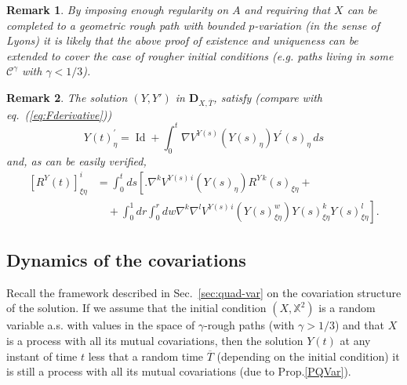 \documentclass[a4paper,12pt,reqno]{amsart}
\DeclareMathOperator{\id}{Id}
\newtheorem{remark}{Remark}
\newcommand{\CC}{\mathscr{C}}
\newcommand{\DX}{\mathscr{D}_{X}}
\begin{document}
\begin{remark}
By imposing enough regularity on $A$ and requiring that $X$
can be completed to a geometric rough path with bounded $p$-variation
(in the sense of Lyons)  it is likely that the above proof of
existence and uniqueness can be extended to cover the case of rougher initial conditions
(e.g. paths living in some $\CC^\gamma$ with $\gamma < 1/3$).
\end{remark}

\begin{remark}
The solution $(Y,Y')$ in $\mathbf{D}_{X,\overline{T}}$, satisfy
 (compare with eq.~(\ref{eq:Fderivative}))
\begin{equation}
  \label{eq:sol1}
Y(t)^{\prime}_\eta = \id + \int_0^t  \nabla  V^{Y(s)}(Y(s)_{\eta}) Y^{\prime}(s)_\eta  \,ds
\end{equation}
and, as can be easily verified,
\begin{equation}
  \label{eq:sol2}
  \begin{split}
[R^{Y}(t)]^i_{\xi\eta} & = \int_0^t ds \left[\Big.
\nabla^k
V^{Y(s)\,i}(Y(s)_{\eta}) R^{Y\,k}(s)_{\xi\eta}     +\right.
\\ & \quad + \left.\int_0^1 dr \int_0^r dw \nabla^k \nabla^l  V^{Y(s)\,i}(Y(s)_{\xi\eta}^w)
Y(s)^k_{\xi\eta} Y(s)^l_{\xi\eta}      \right].
  \end{split}
\end{equation}  
\end{remark}


\subsection{Dynamics of the covariations}
\label{sec:structure}
Recall the framework described in Sec.~\ref{sec:quad-var} on the
covariation structure of the solution. If we assume that the initial
condition $(X,\mathbb{X}^2)$ is a random variable a.s. with values in
the space of $\gamma$-rough paths (with $\gamma > 1/3$) and that $X$ is a
process with all its mutual covariations, then the solution $Y(t)$ at
any instant of time $t$ less that a random time $\overline{T}$
(depending on the initial condition)  it is still a process with all
its mutual covariations (due to  Prop.\ref{PQVar}).    
\end{document}

